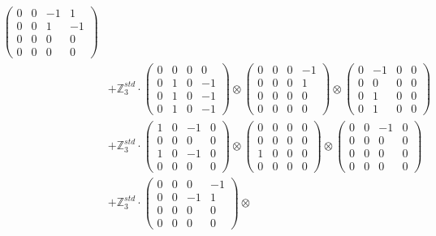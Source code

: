 \documentclass{article}
\begin{document}
{\begin{align}
            \begin{pmatrix} 0 & 0 & -1 & 1 \\ 0 & 0 & 1 & -1 \\ 0 & 0 & 0 & 0 \\ 0 & 0 & 0 & 0 \end{pmatrix} \\ 
        &+ \label{Rs16-Rc11-Solution-15-c25} \mathbb{Z}_3^{std} \cdot 
            \begin{pmatrix} 0 & 0 & 0 & 0 \\ 0 & 1 & 0 & -1 \\ 0 & 1 & 0 & -1 \\ 0 & 1 & 0 & -1 \end{pmatrix} \otimes 
            \begin{pmatrix} 0 & 0 & 0 & -1 \\ 0 & 0 & 0 & 1 \\ 0 & 0 & 0 & 0 \\ 0 & 0 & 0 & 0 \end{pmatrix} \otimes 
            \begin{pmatrix} 0 & -1 & 0 & 0 \\ 0 & 0 & 0 & 0 \\ 0 & 1 & 0 & 0 \\ 0 & 1 & 0 & 0 \end{pmatrix} \\ 
        &+ \label{Rs16-Rc11-Solution-15-c26} \mathbb{Z}_3^{std} \cdot 
            \begin{pmatrix} 1 & 0 & -1 & 0 \\ 0 & 0 & 0 & 0 \\ 1 & 0 & -1 & 0 \\ 0 & 0 & 0 & 0 \end{pmatrix} \otimes 
            \begin{pmatrix} 0 & 0 & 0 & 0 \\ 0 & 0 & 0 & 0 \\ 1 & 0 & 0 & 0 \\ 0 & 0 & 0 & 0 \end{pmatrix} \otimes 
            \begin{pmatrix} 0 & 0 & -1 & 0 \\ 0 & 0 & 0 & 0 \\ 0 & 0 & 0 & 0 \\ 0 & 0 & 0 & 0 \end{pmatrix} \\ 
        &+ \label{Rs16-Rc11-Solution-15-c27} \mathbb{Z}_3^{std} \cdot 
            \begin{pmatrix} 0 & 0 & 0 & -1 \\ 0 & 0 & -1 & 1 \\ 0 & 0 & 0 & 0 \\ 0 & 0 & 0 & 0 \end{pmatrix} \otimes 

\end{align}}
\end{document}
